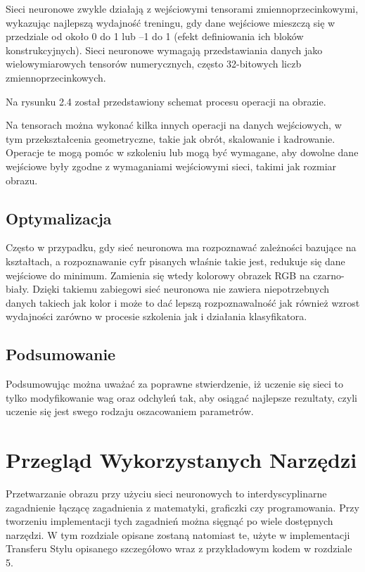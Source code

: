 \documentclass[brudnopis]{xmgr}
\begin{document}
Sieci neuronowe zwykle działają z wejściowymi tensorami zmiennoprzecinkowymi, wykazując najlepszą wydajność treningu, gdy dane wejściowe mieszczą się w przedziale od około 0 do 1 lub –1 do 1 (efekt definiowania ich bloków konstrukcyjnych). Sieci neuronowe wymagają przedstawiania danych jako wielowymiarowych tensorów numerycznych, często 32-bitowych liczb zmiennoprzecinkowych.

Na rysunku 2.4 został przedstawiony schemat procesu operacji na obrazie.

Na tensorach można  wykonać kilka innych operacji na danych wejściowych, w tym przekształcenia geometryczne, takie jak obrót, skalowanie i kadrowanie. Operacje te mogą pomóc w szkoleniu lub mogą być wymagane, aby dowolne dane wejściowe były zgodne z wymaganiami wejściowymi sieci, takimi jak rozmiar obrazu.

 \section{Optymalizacja \label{s:dsssl}}
 
 Często w przypadku, gdy sieć neuronowa ma rozpoznawać zależności bazujące na kształtach, a rozpoznawanie cyfr pisanych właśnie takie jest, redukuje się dane wejściowe do minimum. Zamienia się wtedy kolorowy obrazek RGB na czarno-biały. Dzięki takiemu zabiegowi sieć neuronowa nie zawiera  niepotrzebnych danych takiech jak kolor i może to dać lepszą rozpoznawalność jak również wzrost wydajności zarówno w procesie szkolenia jak i działania klasyfikatora.  



 \section{Podsumowanie \label{s:dsssl}}
 
Podsumowując można uważać za  poprawne stwierdzenie, iż uczenie się sieci to tylko modyfikowanie wag oraz odchyleń tak, aby osiągać najlepsze rezultaty, czyli uczenie się jest swego rodzaju oszacowaniem parametrów.   



\chapter{Przegląd Wykorzystanych Narzędzi}

Przetwarzanie obrazu przy użyciu sieci neuronowych to interdyscyplinarne zagadnienie łączącę zagadnienia z matematyki, graficzki czy programowania. Przy tworzeniu implementacji tych zagadnień można sięgnąć po wiele dostępnych narzędzi. W tym rozdziale opisane zostaną natomiast te, użyte w implementacji Transferu Stylu opisanego szczegółowo wraz z przykładowym kodem w rozdziale 5.
\end{document}
